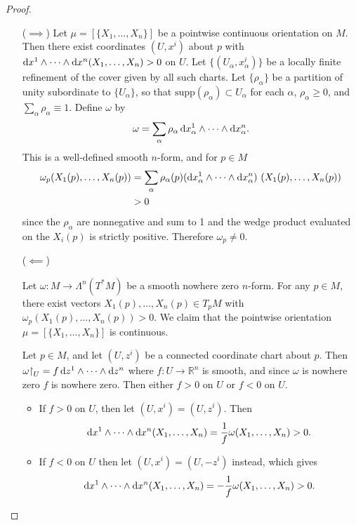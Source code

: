 \begin{proof}
  \begin{itemize}
    \item[($\implies$)]{
      Let $\mu = [\{X_1, \dots, X_n\}]$ be a pointwise continuous
      orientation on $M$. Then there exist coordinates
      $(U, x^i)$ about $p$ with
      $\mathop{}\!\mathrm{d} x^1 \wedge \cdots \wedge \mathop{}\!\mathrm{d} x^n (X_1, \dots, X_n) > 0$
      on $U$. Let
      $\{(U_\alpha, x^i_\alpha)\}$ be a locally finite refinement of
      the cover given by all such charts. Let
      $\{ \rho_\alpha \}$ be a partition of unity subordinate to
      $\{U_\alpha\}$, so that $\mathrm{supp}(\rho_\alpha) \subset
      U_\alpha$ for each $\alpha$,
      $\rho_\alpha \geq 0$, and $\sum_\alpha \rho_\alpha \equiv
      1$.
      Define $\omega$ by
      $$
        \omega
      = \sum_\alpha
          \rho_\alpha
            \mathop{}\!\mathrm{d} x^1_\alpha \wedge \cdots \wedge \mathop{}\!\mathrm{d} x^n_\alpha.
      $$
      This is a well-defined smooth $n$-form, and for $p \in M$
      \begin{align*}
         \omega_p(X_1(p), \dots, X_n(p))
      &= \sum_\alpha
           \rho_\alpha(p)
           (\mathop{}\!\mathrm{d} x^1_\alpha \wedge \cdots \wedge \mathop{}\!\mathrm{d} x^n_\alpha)\
           (X_1(p), \dots, X_n(p)) \\
      &> 0
      \end{align*}
      since the $\rho_\alpha$ are nonnegative and sum to 1 and
      the wedge product evaluated on the $X_i(p)$ is strictly
      positive. Therefore $\omega_p \neq 0$.
    }
    \item[($\impliedby$)]{
      Let $\omega : M \to \Lambda^n(T^\ast M)$ be a smooth
      nowhere zero $n$-form. For any $p \in M$, there exist vectors
      $X_1(p), \dots, X_n(p) \in T_p M$ with
      $\omega_p(X_1(p), \dots, X_n(p)) > 0$. We claim that
      the pointwise orientation
      $\mu = [\{ X_1, \dots, X_n\}]$ is continuous.

      Let $p \in M$, and let $(U, z^i)$ be a connected coordinate
      chart about $p$. Then
      $\omega\mathord{\upharpoonright}_U = f \mathop{}\!\mathrm{d} z^1 \wedge \cdots \wedge \mathop{}\!\mathrm{d} z^n$
      where $f : U \to \mathbb{R}^n$ is smooth, and since $\omega$ is
      nowhere zero $f$ is nowhere zero. Then either $f > 0$ on $U$
      or $f < 0$ on $U$.
      \begin{itemize}
        \item{
          If $f > 0$ on $U$, then let $(U, x^i) = (U, z^i)$. Then
          $$
            \mathop{}\!\mathrm{d} x^1 \wedge \cdots \wedge \mathop{}\!\mathrm{d} x^n
            (X_1, \dots, X_n)
          = \frac{1}{f} \omega(X_1, \dots, X_n)
          > 0.
          $$
        }
        \item{
          If $f < 0$ on $U$ then let $(U, x^i) = (U, -z^i)$ instead,
          which gives
          $$
            \mathop{}\!\mathrm{d} x^1 \wedge \cdots \wedge \mathop{}\!\mathrm{d} x^n
            (X_1, \dots, X_n)
          = -\frac{1}{f} \omega(X_1, \dots, X_n)
          > 0.
          $$
        }
      \end{itemize}
    }
  \end{itemize}
\end{proof}


